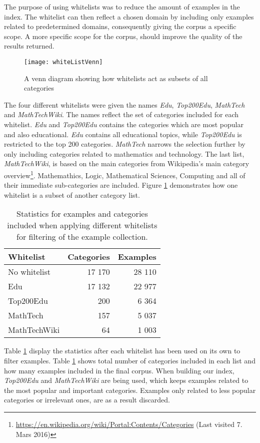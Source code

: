 The purpose of using whitelists was to reduce the amount of examples in the index. The whitelist can then reflect a chosen domain by including only examples related to predetermined domains, consequently giving the corpus a specific scope. A more specific scope for the corpus, should improve the quality of the results returned. 

\begin{figure}[h] 
\caption{A venn diagram showing how whitelists act as subsets of all categories}
\texttt{[image: whiteListVenn]}
\label{fig:whiteListVenn}
\end{figure}
The four different whitelists were given the names \textit{Edu}, \textit{Top200Edu}, \textit{MathTech} and \textit{MathTechWiki}. The names reflect the set of categories included for each whitelist. \textit{Edu} and \textit{Top200Edu} contains the categories which are most popular and also educational. \textit{Edu} contains all educational topics, while \textit{Top200Edu} is restricted to the top 200 categories. \textit{MathTech} narrows the selection further by only including categories related to mathematics and technology. The last list, \textit{MathTechWiki}, is based on the main categories from Wikipedia's main category overview\footnote{\url{https://en.wikipedia.org/wiki/Portal:Contents/Categories} (Last visited 7. Mars 2016)}. Mathemathics, Logic, Mathematical Sciences, Computing and all of their immediate sub-categories are included. Figure \ref{fig:whiteListVenn} demonstrates how one whitelist is a subset of another category list. 

\begin{table}[h!]
\centering
\begin{tabular} {|| p{10em} | r | r||} 
 \hline
  Whitelist & Categories & Examples \\ [0.5ex] 
 \hline
No whitelist & 17 170 & 28 110 \\
Edu & 17 132 & 22 977 \\
Top200Edu & 200 & 6 364 \\
MathTech & 157 & 5 037 \\
MathTechWiki & 64 & 1 003 \\

 \hline
\end{tabular}
\caption{Statistics for examples and categories included when applying different whitelists for filtering of the example collection.}
\label{table:whitelist_stats}
\end{table}

Table \ref{table:whitelist_stats} display the statistics after each whitelist has been used on its own to filter examples. Table \ref{table:whitelist_stats} shows total number of categories included in each list and how many examples included in the final corpus.
When building our index, \textit{Top200Edu} and \textit{MathTechWiki} are being used, which keeps examples related to the most popular and important categories. Examples only related to less popular categories or irrelevant ones, are as a result discarded.


